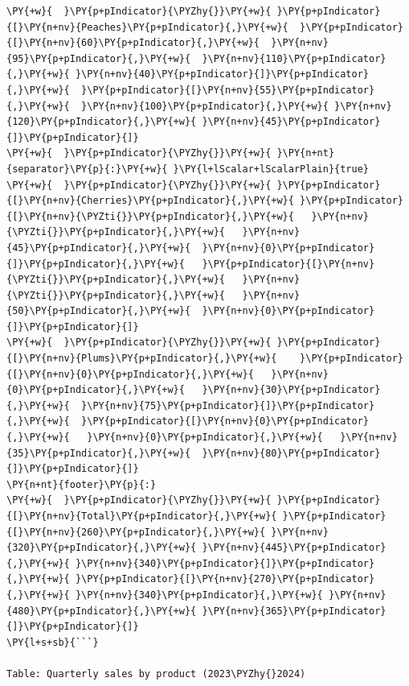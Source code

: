 \documentclass[a4paper,twoside]{article}
\begin{document}
\begin{tscode}[lang=markdown, engine=pygments]
\begin{Verbatim}[commandchars=\\\{\},breaklines, breakanywhere, commandchars=\\\{\}]
\PY{+w}{  }\PY{p+pIndicator}{\PYZhy{}}\PY{+w}{ }\PY{p+pIndicator}{[}\PY{n+nv}{Peaches}\PY{p+pIndicator}{,}\PY{+w}{  }\PY{p+pIndicator}{[}\PY{n+nv}{60}\PY{p+pIndicator}{,}\PY{+w}{  }\PY{n+nv}{95}\PY{p+pIndicator}{,}\PY{+w}{  }\PY{n+nv}{110}\PY{p+pIndicator}{,}\PY{+w}{ }\PY{n+nv}{40}\PY{p+pIndicator}{]}\PY{p+pIndicator}{,}\PY{+w}{  }\PY{p+pIndicator}{[}\PY{n+nv}{55}\PY{p+pIndicator}{,}\PY{+w}{  }\PY{n+nv}{100}\PY{p+pIndicator}{,}\PY{+w}{ }\PY{n+nv}{120}\PY{p+pIndicator}{,}\PY{+w}{ }\PY{n+nv}{45}\PY{p+pIndicator}{]}\PY{p+pIndicator}{]}
\PY{+w}{  }\PY{p+pIndicator}{\PYZhy{}}\PY{+w}{ }\PY{n+nt}{separator}\PY{p}{:}\PY{+w}{ }\PY{l+lScalar+lScalarPlain}{true}
\PY{+w}{  }\PY{p+pIndicator}{\PYZhy{}}\PY{+w}{ }\PY{p+pIndicator}{[}\PY{n+nv}{Cherries}\PY{p+pIndicator}{,}\PY{+w}{ }\PY{p+pIndicator}{[}\PY{n+nv}{\PYZti{}}\PY{p+pIndicator}{,}\PY{+w}{   }\PY{n+nv}{\PYZti{}}\PY{p+pIndicator}{,}\PY{+w}{   }\PY{n+nv}{45}\PY{p+pIndicator}{,}\PY{+w}{  }\PY{n+nv}{0}\PY{p+pIndicator}{]}\PY{p+pIndicator}{,}\PY{+w}{   }\PY{p+pIndicator}{[}\PY{n+nv}{\PYZti{}}\PY{p+pIndicator}{,}\PY{+w}{   }\PY{n+nv}{\PYZti{}}\PY{p+pIndicator}{,}\PY{+w}{   }\PY{n+nv}{50}\PY{p+pIndicator}{,}\PY{+w}{  }\PY{n+nv}{0}\PY{p+pIndicator}{]}\PY{p+pIndicator}{]}
\PY{+w}{  }\PY{p+pIndicator}{\PYZhy{}}\PY{+w}{ }\PY{p+pIndicator}{[}\PY{n+nv}{Plums}\PY{p+pIndicator}{,}\PY{+w}{    }\PY{p+pIndicator}{[}\PY{n+nv}{0}\PY{p+pIndicator}{,}\PY{+w}{   }\PY{n+nv}{0}\PY{p+pIndicator}{,}\PY{+w}{   }\PY{n+nv}{30}\PY{p+pIndicator}{,}\PY{+w}{  }\PY{n+nv}{75}\PY{p+pIndicator}{]}\PY{p+pIndicator}{,}\PY{+w}{  }\PY{p+pIndicator}{[}\PY{n+nv}{0}\PY{p+pIndicator}{,}\PY{+w}{   }\PY{n+nv}{0}\PY{p+pIndicator}{,}\PY{+w}{   }\PY{n+nv}{35}\PY{p+pIndicator}{,}\PY{+w}{  }\PY{n+nv}{80}\PY{p+pIndicator}{]}\PY{p+pIndicator}{]}
\PY{n+nt}{footer}\PY{p}{:}
\PY{+w}{  }\PY{p+pIndicator}{\PYZhy{}}\PY{+w}{ }\PY{p+pIndicator}{[}\PY{n+nv}{Total}\PY{p+pIndicator}{,}\PY{+w}{ }\PY{p+pIndicator}{[}\PY{n+nv}{260}\PY{p+pIndicator}{,}\PY{+w}{ }\PY{n+nv}{320}\PY{p+pIndicator}{,}\PY{+w}{ }\PY{n+nv}{445}\PY{p+pIndicator}{,}\PY{+w}{ }\PY{n+nv}{340}\PY{p+pIndicator}{]}\PY{p+pIndicator}{,}\PY{+w}{ }\PY{p+pIndicator}{[}\PY{n+nv}{270}\PY{p+pIndicator}{,}\PY{+w}{ }\PY{n+nv}{340}\PY{p+pIndicator}{,}\PY{+w}{ }\PY{n+nv}{480}\PY{p+pIndicator}{,}\PY{+w}{ }\PY{n+nv}{365}\PY{p+pIndicator}{]}\PY{p+pIndicator}{]}
\PY{l+s+sb}{```}

Table: Quarterly sales by product (2023\PYZhy{}2024)
\end{Verbatim}
\end{tscode}
\end{document}
